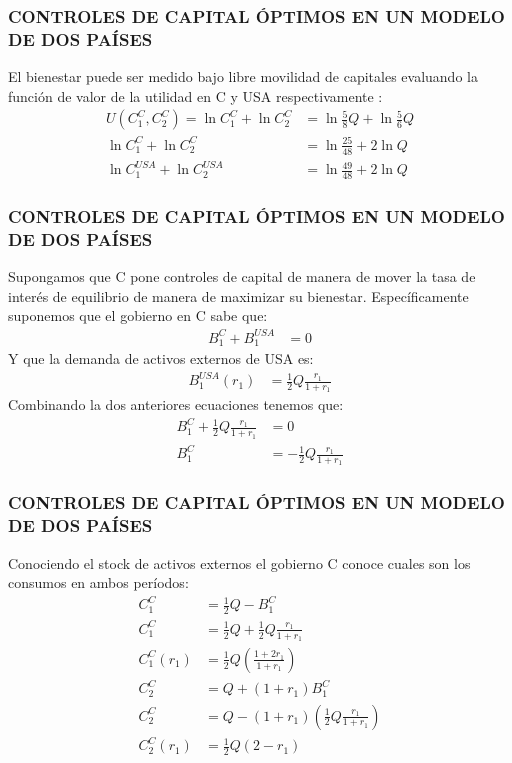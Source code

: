 \documentclass[10pt, xcolor=table, x11names]{beamer}
\begin{document}
\begin{frame}[label=11]
	\frametitle{{\normalsize CONTROLES DE CAPITAL ÓPTIMOS EN UN MODELO DE DOS PAÍSES} {}}
	El bienestar puede ser medido bajo libre movilidad de capitales evaluando la función de valor de la utilidad en C y USA respectivamente :
	\begin{align}
		U(C_{1}^{C}, C_{2}^{C})= \ln{C_{1}^{C}}+ \ln{C_{2}^{C}}&=\ln{\frac{5}{8}Q}+ \ln{\frac{5}{6}Q}\nonumber \\
		\ln{C_{1}^{C}}+ \ln{C_{2}^{C}}&=\ln{\frac{25}{48}}+2\ln{Q}\\
		\ln{C_{1}^{USA}}+ \ln{C_{2}^{USA}}&=\ln{\frac{49}{48}}+2\ln{Q}
	\end{align}
	
\end{frame}
\begin{frame}[label=12]
	\frametitle{{\normalsize CONTROLES DE CAPITAL ÓPTIMOS EN UN MODELO DE DOS PAÍSES} {}}
	Supongamos que C pone controles de capital de manera de mover la tasa de interés de equilibrio de manera de maximizar su bienestar. Específicamente suponemos que el gobierno en C sabe que:
	\begin{align}
	B_{1}^{C}+B_{1}^{USA}&=0 
	\end{align}
	Y que la demanda de activos externos de USA es:
	\begin{align}
	B_{1}^{USA}(r_{1})&= \frac{1}{2}Q\frac{r_{1}}{1+r_{1}}
	\end{align}
	Combinando la dos anteriores ecuaciones tenemos que:
	\begin{align}
	B_{1}^{C}+\frac{1}{2}Q\frac{r_{1}}{1+r_{1}}&=0 \nonumber \\
	B_{1}^{C}&=-\frac{1}{2}Q\frac{r_{1}}{1+r_{1}} 
	\end{align}
\end{frame}

\begin{frame}[label=13]
	\frametitle{{\normalsize CONTROLES DE CAPITAL ÓPTIMOS EN UN MODELO DE DOS PAÍSES} {}}
	Conociendo el stock de activos externos el gobierno C conoce cuales son los consumos en ambos períodos:
	\begin{align}
	C_{1}^{C}&=\frac{1}{2}Q-B_{1}^{C}\nonumber \\
	C_{1}^{C}&=\frac{1}{2}Q+\frac{1}{2}Q\frac{r_{1}}{1+r_{1}}\nonumber \\
	C_{1}^{C}(r_{1})&=\frac{1}{2}Q(\frac{1+2r_{1}}{1+r_{1}})\\
	C_{2}^{C}&=Q+(1+r_{1})B_{1}^{C}\nonumber \\
	C_{2}^{C}&=Q-(1+r_{1})(\frac{1}{2}Q\frac{r_{1}}{1+r_{1}})\nonumber \\
	C_{2}^{C}(r_{1})&=\frac{1}{2}Q(2-r_{1})
	\end{align}
	
\end{frame}
\end{document}
